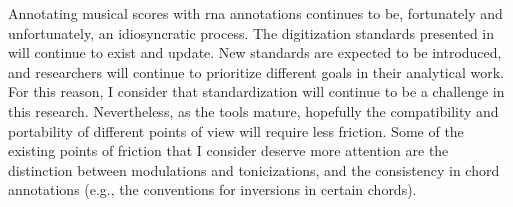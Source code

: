 
Annotating musical scores with \gls{rna} annotations
continues to be, fortunately and unfortunately, an
idiosyncratic process. The digitization standards presented
in  will continue to exist and
update. New standards are expected to be introduced, and
researchers will continue to prioritize different goals in
their analytical work. For this reason, I consider that
standardization will continue to be a challenge in this
research. Nevertheless, as the tools mature, hopefully the
compatibility and portability of different points of view
will require less friction. Some of the existing points of
friction that I consider deserve more attention are the
distinction between modulations and tonicizations, and the
consistency in chord annotations (e.g., the conventions for
inversions in certain chords).
